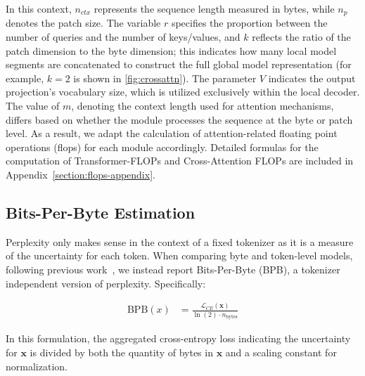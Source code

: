 In this context, $n_{ctx}$ represents the sequence length measured in bytes, while $n_p$ denotes the patch size. The variable $r$ specifies the proportion between the number of queries and the number of keys/values, and $k$ reflects the ratio of the patch dimension to the byte dimension; this indicates how many local model segments are concatenated to construct the full global model representation (for example, $k=2$ is shown in \autoref{fig:crossattn}). The parameter $V$ indicates the output projection's vocabulary size, which is utilized exclusively within the local decoder. The value of $m$, denoting the context length used for attention mechanisms, differs based on whether the module processes the sequence at the byte or patch level. As a result, we adapt the calculation of attention-related floating point operations (flops) for each module accordingly. Detailed formulas for the computation of Transformer-FLOPs and Cross-Attention FLOPs are included in Appendix~\ref{section:flops-appendix}.

\subsection{Bits-Per-Byte Estimation} Perplexity only makes sense in the context of a fixed tokenizer as it is a measure of the uncertainty for each token. When comparing byte and token-level models, following previous work~\citep{xue2022byt5, yu2023megabyte, wang2024mambabyte}, we instead report Bits-Per-Byte (BPB), a tokenizer independent version of perplexity. Specifically:

\begin{align}
    \text{BPB}(x)&= \frac{\mathcal{L}_{CE}(\pmb{x})}{\ln(2)\cdot n_{\text{bytes}}}
\end{align}

In this formulation, the aggregated cross-entropy loss indicating the uncertainty for $\pmb{x}$ is divided by both the quantity of bytes in $\pmb{x}$ and a scaling constant for normalization.

